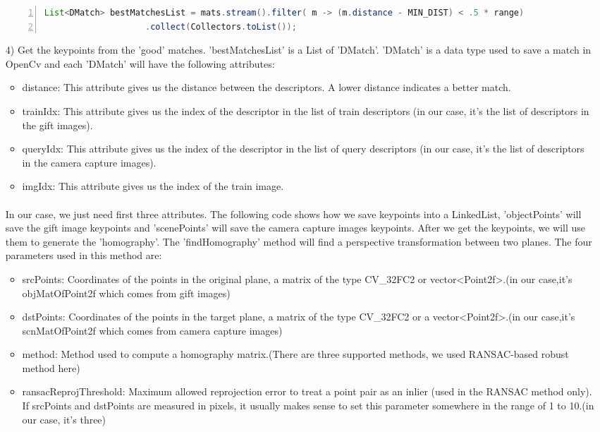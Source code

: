 \begin{enumerate}
\begin{lstlisting}[language={java},
        numbers=left,basicstyle=\small\ttfamily,breaklines=true]
List<DMatch> bestMatchesList = mats.stream().filter( m -> (m.distance - MIN_DIST) < .5 * range)
                    .collect(Collectors.toList());
\end{lstlisting} 
\item[4)] Get the keypoints from the 'good' matches. 'bestMatchesList' is a List of 'DMatch'. 'DMatch' is a data type used to save a match in OpenCv and each 'DMatch' will have the following attributes:
\begin{itemize}
\item distance: This attribute gives us the distance between the descriptors. A lower distance indicates a better match.
\item trainIdx: This attribute gives us the index of the descriptor in the list of train descriptors (in our case, it’s the list of descriptors in the gift images).
\item queryIdx: This attribute gives us the index of the descriptor in the list of query descriptors (in our case, it’s the list of descriptors in the camera capture images).
\item imgIdx: This attribute gives us the index of the train image. 
\end{itemize}
\paragraph{} In our case, we just need first three attributes. The following code shows how we save keypoints into a LinkedList, 'objectPoints' will save the gift image keypoints and 'scenePoints' will save the camera capture images keypoints. After we get the keypoints, we will use them to generate the 'homography'. The 'findHomography' method will find a perspective transformation between two planes. The four parameters used in this method are:
\begin{itemize}
\item srcPoints: Coordinates of the points in the original plane, a matrix of the type CV\_32FC2 or vector\textless Point2f\textgreater.(in our case,it's objMatOfPoint2f which comes from gift images)
\item dstPoints: Coordinates of the points in the target plane, a matrix of the type CV\_32FC2 or a vector\textless Point2f\textgreater .(in our case,it's scnMatOfPoint2f which comes from camera capture images)
\item method: Method used to compute a homography matrix.(There are three supported methods, we used RANSAC-based robust method here)
\item ransacReprojThreshold: Maximum allowed reprojection error to treat a point pair as an inlier (used in the RANSAC method only). If srcPoints and dstPoints are measured in pixels, it usually makes sense to set this parameter somewhere in the range of 1 to 10.(in our case, it's three)
\end{itemize}


\end{enumerate}
